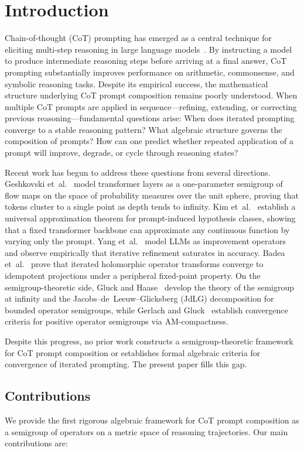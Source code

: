 \section{Introduction}\label{sec:intro}

Chain-of-thought (CoT) prompting has emerged as a central technique for
eliciting multi-step reasoning in large language models~\cite{Wei2022}. By
instructing a model to produce intermediate reasoning steps before arriving at
a final answer, CoT prompting substantially improves performance on arithmetic,
commonsense, and symbolic reasoning tasks. Despite its empirical success,
the mathematical structure underlying CoT prompt composition remains poorly
understood. When multiple CoT prompts are applied in sequence---refining,
extending, or correcting previous reasoning---fundamental questions arise: When
does iterated prompting converge to a stable reasoning pattern? What algebraic
structure governs the composition of prompts? How can one predict whether
repeated application of a prompt will improve, degrade, or cycle through
reasoning states?

Recent work has begun to address these questions from several directions.
Geshkovski et~al.~\cite{Geshkovski2023} model transformer layers as a
one-parameter semigroup of flow maps on the space of probability measures over
the unit sphere, proving that tokens cluster to a single point as depth tends
to infinity. Kim et~al.~\cite{Kim2025} establish a universal approximation
theorem for prompt-induced hypothesis classes, showing that a fixed transformer
backbone can approximate any continuous function by varying only the prompt.
Yang et~al.~\cite{Yang2025} model LLMs as improvement operators and observe
empirically that iterative refinement saturates in accuracy. Badea
et~al.~\cite{Badea2025} prove that iterated holomorphic operator transforms
converge to idempotent projections under a peripheral fixed-point property. On
the semigroup-theoretic side, Gluck and Haase~\cite{Gluck2018} develop the
theory of the semigroup at infinity and the Jacobs--de~Leeuw--Glicksberg
(JdLG) decomposition for bounded operator semigroups, while Gerlach and
Gluck~\cite{Gerlach2017} establish convergence criteria for positive operator
semigroups via AM-compactness.

Despite this progress, no prior work constructs a semigroup-theoretic framework
for CoT prompt composition or establishes formal algebraic criteria for
convergence of iterated prompting. The present paper fills this gap.

\subsection*{Contributions}
We provide the first rigorous algebraic framework for CoT prompt composition as
a semigroup of operators on a metric space of reasoning trajectories. Our main
contributions are:

